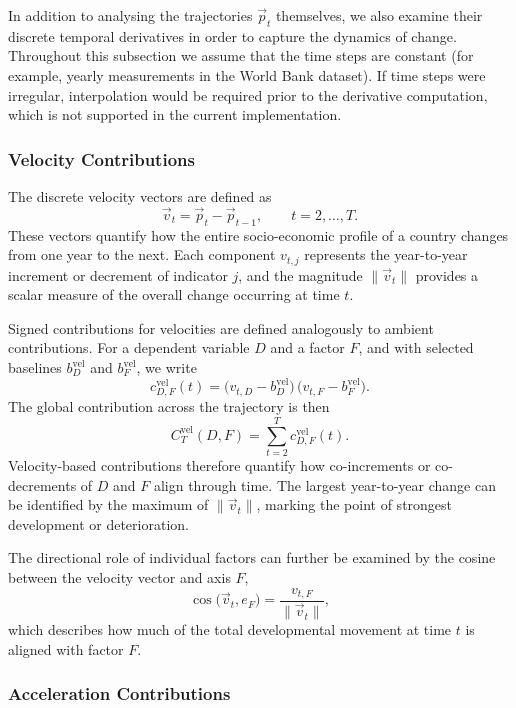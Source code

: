         In addition to analysing the trajectories $\vec{p}_t$ themselves, we also examine their discrete temporal derivatives in order to capture the dynamics of change. Throughout this subsection we assume that the time steps are constant (for example, yearly measurements in the World Bank dataset). If time steps were irregular, interpolation would be required prior to the derivative computation, which is not supported in the current implementation.

        \subsubsection{Velocity Contributions}

            The discrete velocity vectors are defined as
            \[
                \vec{v}_t = \vec{p}_t - \vec{p}_{t-1}, \qquad t = 2,\ldots,T.
            \]
            These vectors quantify how the entire socio-economic profile of a country changes from one year to the next. Each component $v_{t,j}$ represents the year-to-year increment or decrement of indicator $j$, and the magnitude $\|\vec{v}_t\|$ provides a scalar measure of the overall change occurring at time $t$.

            Signed contributions for velocities are defined analogously to ambient contributions. For a dependent variable $D$ and a factor $F$, and with selected baselines $b^{\mathrm{vel}}_D$ and $b^{\mathrm{vel}}_F$, we write
            \[
                c^{\mathrm{vel}}_{D,F}(t)
                  = \big(v_{t,D} - b^{\mathrm{vel}}_D\big)\,\big(v_{t,F} - b^{\mathrm{vel}}_F\big).
            \]
            The global contribution across the trajectory is then
            \[
                C^{\mathrm{vel}}_T(D,F)
                  = \sum_{t=2}^{T} c^{\mathrm{vel}}_{D,F}(t).
            \]
            Velocity-based contributions therefore quantify how co-increments or co-decrements of $D$ and $F$ align through time. The largest year-to-year change can be identified by the maximum of $\|\vec{v}_t\|$, marking the point of strongest development or deterioration.

            The directional role of individual factors can further be examined by the cosine between the velocity vector and axis $F$,
            \[
                \cos\big(\vec{v}_t, e_F\big) = \frac{v_{t,F}}{\|\vec{v}_t\|},
            \]
            which describes how much of the total developmental movement at time $t$ is aligned with factor $F$.

        \subsubsection{Acceleration Contributions}

